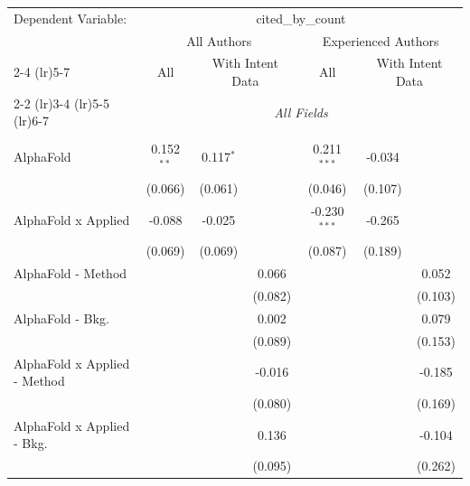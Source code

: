 \begingroup
\centering
\begin{tabular}{lcccccc}
   \tabularnewline \midrule \midrule
   Dependent Variable: & \multicolumn{6}{c}{cited\_by\_count}\\
 & \multicolumn{3}{c}{All Authors} & \multicolumn{3}{c}{Experienced Authors} \\
\cmidrule(lr){2-4} \cmidrule(lr){5-7}
 & \multicolumn{1}{c}{All} & \multicolumn{2}{c}{With Intent Data} & \multicolumn{1}{c}{All} & \multicolumn{2}{c}{With Intent Data} \\
\cmidrule(lr){2-2} \cmidrule(lr){3-4} \cmidrule(lr){5-5} \cmidrule(lr){6-7}
 & \multicolumn{6}{c}{\textit{All Fields}} \\ \\
   AlphaFold                      & 0.152$^{**}$   & 0.117$^{*}$   &               & 0.211$^{***}$  & -0.034  &   \\   
                                  & (0.066)        & (0.061)       &               & (0.046)        & (0.107) &   \\   
   AlphaFold x Applied            & -0.088         & -0.025        &               & -0.230$^{***}$ & -0.265  &   \\   
                                  & (0.069)        & (0.069)       &               & (0.087)        & (0.189) &   \\   
   AlphaFold - Method             &                &               & 0.066         &                &         & 0.052\\   
                                  &                &               & (0.082)       &                &         & (0.103)\\   
   AlphaFold - Bkg.               &                &               & 0.002         &                &         & 0.079\\   
                                  &                &               & (0.089)       &                &         & (0.153)\\   
   AlphaFold x Applied - Method   &                &               & -0.016        &                &         & -0.185\\   
                                  &                &               & (0.080)       &                &         & (0.169)\\   
   AlphaFold x Applied - Bkg.     &                &               & 0.136         &                &         & -0.104\\   
                                  &                &               & (0.095)       &                &         & (0.262)\\   

\end{tabular}

